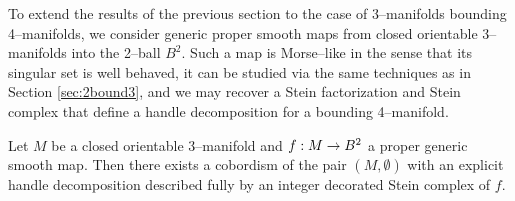 \label{sec:3bound4}

To extend the results of the previous section to the case of 3--manifolds bounding 4--manifolds, we consider generic proper smooth maps from closed orientable 3--manifolds into the 2--ball $B^2$.
Such a map is Morse--like in the sense that its singular set is well behaved, it can be studied via the same techniques as in Section \ref{sec:2bound3}, and we may recover a Stein factorization and Stein complex that define a handle decomposition for a bounding 4--manifold.

\begin{theorem}
	\label{thm:3bound4}
	Let $M$ be a closed orientable 3--manifold and $f:M\to B^2$ a proper generic smooth map.
	Then there exists a cobordism of the pair $(M,\emptyset)$ with an explicit handle decomposition described fully by an integer decorated Stein complex of $f$.
\end{theorem}

